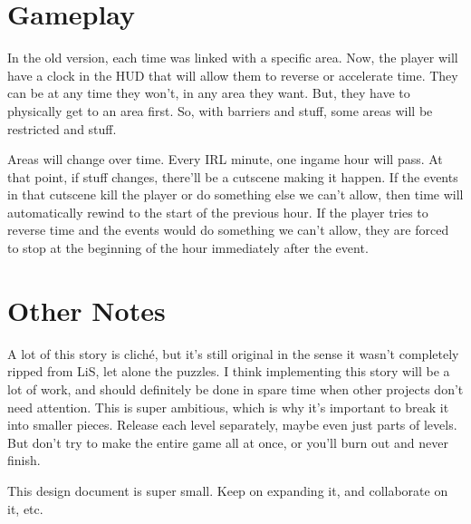 \documentclass[a4paper,12pt]{article}
\begin{document}
  \section{Gameplay}
  In the old version, each time was linked with a specific area. Now, the player will have a clock in the HUD that will allow them to reverse or accelerate time. They can be at any time they won't, in any area they want. But, they have to physically get to an area first. So, with barriers and stuff, some areas will be restricted and stuff.

  Areas will change over time. Every IRL minute, one ingame hour will pass. At that point, if stuff changes, there'll be a cutscene making it happen. If the events in that cutscene kill the player or do something else we can't allow, then time will automatically rewind to the start of the previous hour. If the player tries to reverse time and the events would do something we can't allow, they are forced to stop at the beginning of the hour immediately after the event.

  \section{Other Notes}
  A lot of this story is clich\'e, but it's still original in the sense it wasn't completely ripped from LiS, let alone the puzzles. I think implementing this story will be a lot of work, and should definitely be done in spare time when other projects don't need attention. This is super ambitious, which is why it's important to break it into smaller pieces. Release each level separately, maybe even just parts of levels. But don't try to make the entire game all at once, or you'll burn out and never finish.

  This design document is super small. Keep on expanding it, and collaborate on it, etc.
\end{document}
